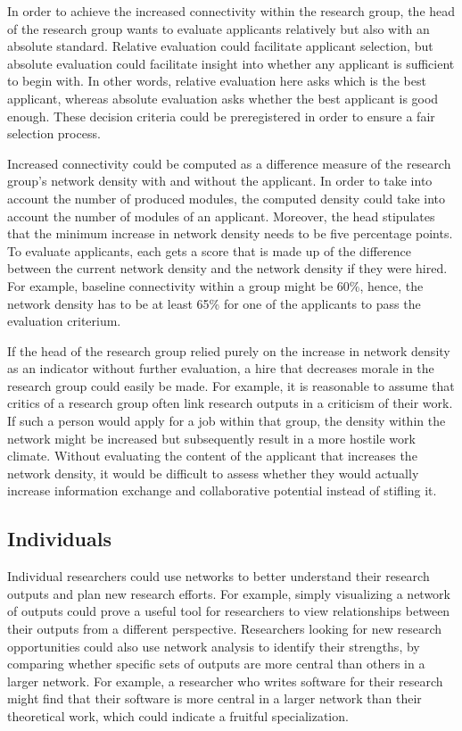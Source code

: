 \documentclass[a5paper]{book}
\begin{document}
In order to achieve the increased connectivity within the research
group, the head of the research group wants to evaluate applicants
relatively but also with an absolute standard. Relative evaluation could
facilitate applicant selection, but absolute evaluation could facilitate
insight into whether any applicant is sufficient to begin with. In other
words, relative evaluation here asks which is the best applicant,
whereas absolute evaluation asks whether the best applicant is good
enough. These decision criteria could be preregistered in order to
ensure a fair selection process.

Increased connectivity could be computed as a difference measure of the
research group's network density with and without the applicant. In
order to take into account the number of produced modules, the computed
density could take into account the number of modules of an applicant.
Moreover, the head stipulates that the minimum increase in network
density needs to be five percentage points. To evaluate applicants, each
gets a score that is made up of the difference between the current
network density and the network density if they were hired. For example,
baseline connectivity within a group might be 60\%, hence, the network
density has to be at least 65\% for one of the applicants to pass the
evaluation criterium.

If the head of the research group relied purely on the increase in
network density as an indicator without further evaluation, a hire that
decreases morale in the research group could easily be made. For
example, it is reasonable to assume that critics of a research group
often link research outputs in a criticism of their work. If such a
person would apply for a job within that group, the density within the
network might be increased but subsequently result in a more hostile
work climate. Without evaluating the content of the applicant that
increases the network density, it would be difficult to assess whether
they would actually increase information exchange and collaborative
potential instead of stifling it.

\subsection{Individuals}\label{individuals}

Individual researchers could use networks to better understand their
research outputs and plan new research efforts. For example, simply
visualizing a network of outputs could prove a useful tool for
researchers to view relationships between their outputs from a different
perspective. Researchers looking for new research opportunities could
also use network analysis to identify their strengths, by comparing
whether specific sets of outputs are more central than others in a
larger network. For example, a researcher who writes software for their
research might find that their software is more central in a larger
network than their theoretical work, which could indicate a fruitful
specialization.
\end{document}
